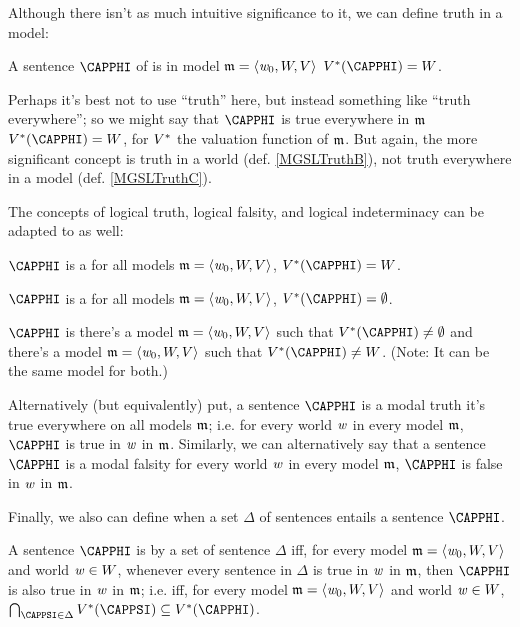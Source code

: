 \noindent{}Although there isn't as much intuitive significance to it, we can define truth in a model:
\begin{majorILnc}{}
A sentence $\CAPPHI$ of \MGSL{} is  in model $\mathfrak{m}=\langle\mathit{w}_0,W,V\rangle$ \Iff $\integer{V}^*(\CAPPHI)=\integer{W}$.
\end{majorILnc}
\noindent{}Perhaps it's best not to use ``truth'' here, but instead something like ``truth everywhere''; so we might say that $\CAPPHI$ is true everywhere in $\mathfrak{m}$ \Iff $\integer{V}^*(\CAPPHI)=\integer{W}$, for $V^*$ the valuation function of $\mathfrak{m}$.
But again, the more significant concept is truth in a world (def. \ref{MGSLTruthB}), not truth everywhere in a model (def. \ref{MGSLTruthC}). 

The concepts of logical truth, logical falsity, and logical indeterminacy can be adapted to \MGSL{} as well:
\begin{majorILnc}{}
$\CAPPHI$ is a  \Iff for all models $\mathfrak{m}=\langle\mathit{w}_0,W,V\rangle$, $\integer{V}^*(\CAPPHI)=\integer{W}$.
\end{majorILnc}
\begin{majorILnc}{}
$\CAPPHI$ is a  \Iff for all models $\mathfrak{m}=\langle\mathit{w}_0,W,V\rangle$, $\integer{V}^*(\CAPPHI)=\emptyset$.
\end{majorILnc}
\begin{majorILnc}{}
$\CAPPHI$ is  \Iff there's a model $\mathfrak{m}=\langle\mathit{w}_0,W,V\rangle$ such that $\integer{V}^*(\CAPPHI)\neq\emptyset$ and there's a model $\mathfrak{m}=\langle\mathit{w}_0,W,V\rangle$ such that $\integer{V}^*(\CAPPHI)\neq\integer{W}$.  (Note: It can be the same model for both.)
\end{majorILnc}
\noindent{}Alternatively (but equivalently) put, a sentence $\CAPPHI$ is a modal truth \Iff it's true everywhere on all models $\mathfrak{m}$; i.e. \Iff for every world $\mathit{w}$ in every model $\mathfrak{m}$, $\CAPPHI$ is true in $\mathit{w}$ in $\mathfrak{m}$. 
Similarly, we can alternatively say that a sentence $\CAPPHI$ is a modal falsity \Iff for every world $\mathit{w}$ in every model $\mathfrak{m}$, $\CAPPHI$ is false in $\mathit{w}$ in $\mathfrak{m}$.

Finally, we also can define when a set $\Delta$ of \MGSL{} sentences entails a sentence $\CAPPHI$.
\begin{majorILnc}{}
A sentence $\CAPPHI$ is  by a set of sentence $\Delta$ iff, for every model $\mathfrak{m}=\langle\mathit{w}_0,W,V\rangle$ and world $\mathit{w}\in W$, whenever every sentence in $\Delta$ is true in $\mathit{w}$ in $\mathfrak{m}$, then $\CAPPHI$ is also true in $\mathit{w}$ in $\mathfrak{m}$; i.e. iff, for every model $\mathfrak{m}=\langle\mathit{w}_0,W,V\rangle$ and world $\mathit{w}\in W$,  $\bigcap_{\CAPPSI\in\Delta}\integer{V}^*(\CAPPSI)\subseteq\integer{V}^*(\CAPPHI)$.
\end{majorILnc}

